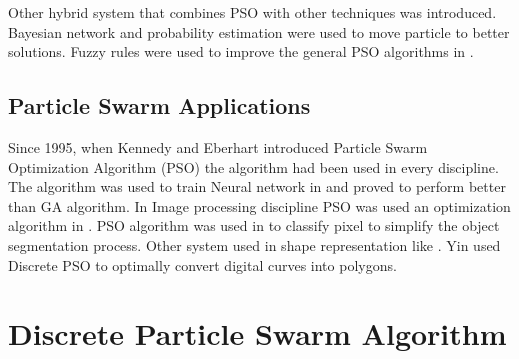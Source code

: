 Other hybrid system that combines PSO with other techniques was introduced. Bayesian network and probability estimation were used to move particle to better solutions. Fuzzy rules were used to improve the general PSO algorithms in \cite{shapeFuzzy}.  

\subsection{Particle Swarm Applications}
\label{sec:SwarmApp}

 Since 1995, when Kennedy and Eberhart \cite{PSOFirst,PSO2} introduced Particle Swarm Optimization Algorithm (PSO) the algorithm had been used in every discipline. The algorithm was used to train Neural network in \cite{PSOandNeuarl} and proved to perform better than GA algorithm. In Image processing discipline PSO was used an optimization algorithm in \cite{SwarmImageProcessing,Swarmimageprocessing2,Colorquantization,SwarmMedical}. PSO algorithm was used in \cite{PSOIMageClassification} to classify pixel to simplify the object segmentation process. Other system used in shape representation like \cite{shapeFuzzy}. Yin \cite{PolygonApproximationPSO} used Discrete PSO to optimally convert digital curves into polygons. 


\section{Discrete Particle Swarm Algorithm}
\label{sec:ParticleSwarmAlgorithm} 


  
